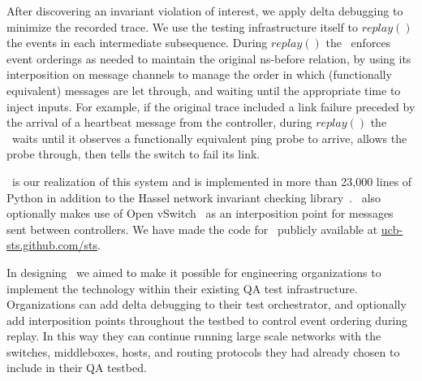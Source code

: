  After discovering an invariant
violation of interest, we apply delta debugging to minimize the recorded trace. We use the
testing infrastructure itself to $replay()$ the events in each intermediate subsequence.
During $replay()$ the \tester~enforces event orderings as needed to maintain the original ns-before
relation, by using its interposition on message channels to
manage the order in which (functionally equivalent) messages are let through,
and waiting until the appropriate time to inject inputs. For example, if the
original trace included a link failure preceded by the arrival of a heartbeat
message from the controller, during $replay()$ the \tester~waits until it observes
a functionally equivalent ping probe to arrive, allows the probe
through, then tells the switch to fail its link. %


\projectname~is our realization of this system and is implemented in more than 23,000 lines of Python in
addition to the Hassel network invariant checking library~\cite{hsa}.
\projectname~also optionally makes use of Open vSwitch~\cite{pfaff2009extending} as an interposition point for
messages sent between controllers. We have
made the code for \projectname~publicly available at \href{http://ucb-sts.github.com/sts}{ucb-sts.github.com/sts}.

 In designing \projectname~we aimed to make
it possible for engineering organizations to
implement the technology within their existing QA test infrastructure.
Organizations can add delta debugging to their test
orchestrator, and optionally add interposition points throughout the
testbed to control event ordering during replay.
In this way they can continue running large scale networks with
the switches, middleboxes, hosts, and routing protocols they had already
chosen to include in their QA testbed.

